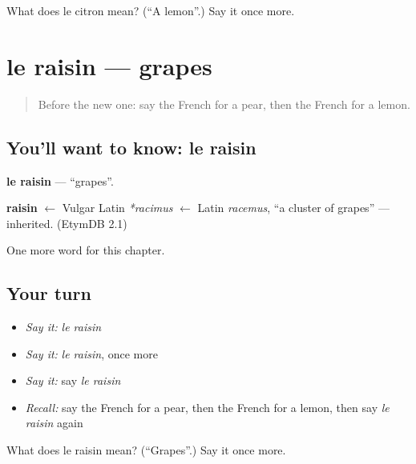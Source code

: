 \begin{tcolorbox}[breakable,colback=teal!4,colframe=teal!35!black,title={Before you move on}]
What does le citron mean? (\textquotedblleft{}A lemon\textquotedblright{}.) Say it once more.
\end{tcolorbox}
\section[le raisin]{le raisin — grapes}

\label{lesson:FR-C71-raisin}



\begin{quote}
Before the new one: say the French for a pear, then the French for a lemon.
\end{quote}

\subsection*{You'll want to know: le raisin}
\textbf{le raisin} — \textquotedblleft{}grapes\textquotedblright{}.

\begin{cousinweb}
\textbf{raisin} $\leftarrow$ Vulgar Latin \emph{*racimus} $\leftarrow$ Latin \emph{racemus}, \textquotedblleft{}a cluster of grapes\textquotedblright{} — inherited. (EtymDB 2.1)
\end{cousinweb}

\begin{grammarlens}[title={What you've built}]
One more word for this chapter.
\end{grammarlens}

\subsection*{Your turn}
\begin{itemize}
\raggedright
  \item \emph{Say it:} \emph{le raisin}
  \item \emph{Say it:} \emph{le raisin}, once more
  \item \emph{Say it:} say \emph{le raisin}
  \item \emph{Recall:} say the French for a pear, then the French for a lemon, then say \emph{le raisin} again
\end{itemize}

\begin{tcolorbox}[breakable,colback=teal!4,colframe=teal!35!black,title={Before you move on}]
What does le raisin mean? (\textquotedblleft{}Grapes\textquotedblright{}.) Say it once more.
\end{tcolorbox}

